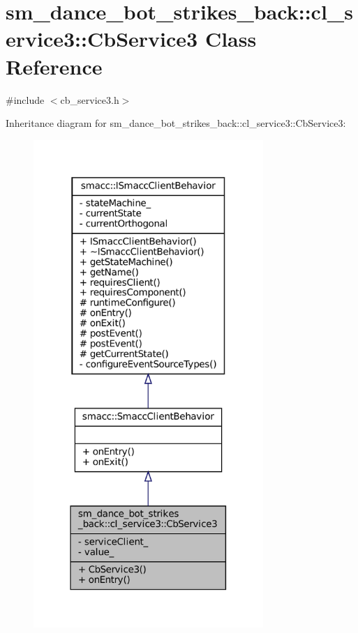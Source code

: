 \hypertarget{classsm__dance__bot__strikes__back_1_1cl__service3_1_1CbService3}{}\section{sm\+\_\+dance\+\_\+bot\+\_\+strikes\+\_\+back\+:\+:cl\+\_\+service3\+:\+:Cb\+Service3 Class Reference}
\label{classsm__dance__bot__strikes__back_1_1cl__service3_1_1CbService3}


{\ttfamily \#include $<$cb\+\_\+service3.\+h$>$}



Inheritance diagram for sm\+\_\+dance\+\_\+bot\+\_\+strikes\+\_\+back\+:\+:cl\+\_\+service3\+:\+:Cb\+Service3\+:
\nopagebreak
\begin{figure}[H]
\begin{center}
\leavevmode
\includegraphics[width=247pt]{classsm__dance__bot__strikes__back_1_1cl__service3_1_1CbService3__inherit__graph}
\end{center}
\end{figure}


